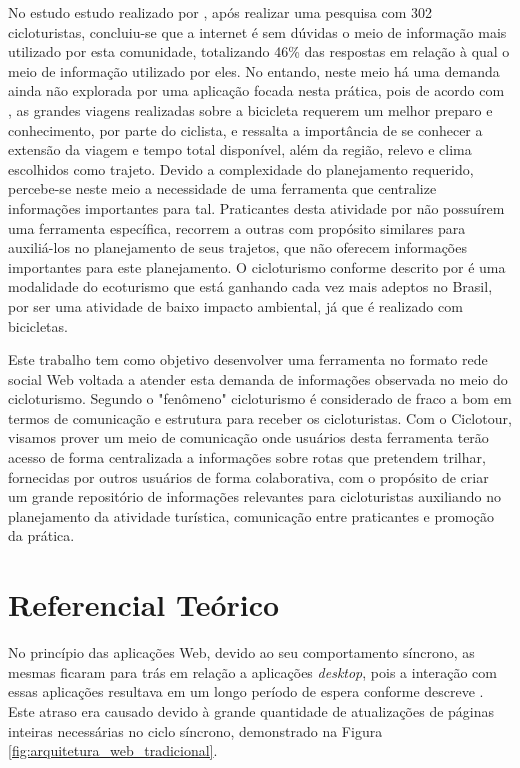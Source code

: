 No estudo estudo realizado por \cite{perfilCicloturista}, após realizar uma pesquisa com 302 cicloturistas, concluiu-se que a internet é sem dúvidas 
o meio de informação mais utilizado por esta comunidade, totalizando 46\% das respostas em relação à qual o meio de informação utilizado por eles.
No entando, neste meio há uma demanda ainda não explorada por uma aplicação focada nesta prática, pois de acordo com \cite{cicloturismo02}, 
as grandes viagens realizadas sobre a bicicleta requerem um melhor preparo e conhecimento, por parte do ciclista, e ressalta a importância de se 
conhecer a extensão da viagem e tempo total disponível, além da região, relevo e clima escolhidos como trajeto. Devido a complexidade do planejamento
requerido, percebe-se neste meio a necessidade de uma ferramenta que centralize informações importantes para tal. Praticantes desta atividade por não 
possuírem uma ferramenta específica, recorrem a outras com propósito similares para auxiliá-los no planejamento de seus trajetos, que não oferecem 
informações importantes para este planejamento. O cicloturismo conforme descrito por \cite{cicloturismo01} é uma modalidade do ecoturismo que está 
ganhando cada vez mais adeptos no Brasil, por ser uma atividade de baixo impacto ambiental, já que é realizado com bicicletas.

Este trabalho tem como objetivo desenvolver uma ferramenta no formato rede social Web voltada a atender esta demanda de informações observada 
no meio do cicloturismo. Segundo \cite{perfilCicloturista} o  "fenômeno" cicloturismo é considerado de fraco a bom em termos de comunicação 
e estrutura para receber os cicloturistas. Com o Ciclotour, visamos prover um meio de comunicação onde usuários desta ferramenta terão acesso de 
forma centralizada a informações sobre rotas que pretendem trilhar, fornecidas por outros usuários de forma colaborativa, com o propósito 
de criar um grande repositório de informações relevantes para cicloturistas auxiliando no planejamento da atividade turística, comunicação entre 
praticantes e promoção da prática.

\section{\esp Referencial Teórico}
No princípio das aplicações Web, devido ao seu comportamento síncrono, as mesmas ficaram para trás em relação a aplicações \textit{desktop}, pois a 
interação com essas aplicações resultava em um longo período de espera conforme descreve \cite{deitelAjax}. Este atraso era causado devido à grande 
quantidade de atualizações de páginas inteiras necessárias no ciclo síncrono, demonstrado na Figura \ref{fig:arquitetura_web_tradicional}. 

